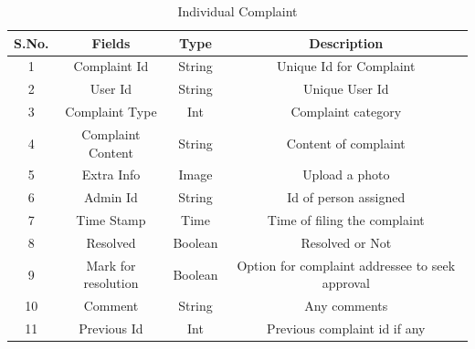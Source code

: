 \documentclass{article}
\begin{document}
\begin{table}[H]
\centering
\caption{Individual Complaint}
\label{my-label}
\begin{tabular}{|c|c|c|c|}
\hline
\textbf{S.No.} & \textbf{Fields}     & \textbf{Type} & \textbf{Description}                            \\ \hline
1              & Complaint Id        & String        & Unique Id for Complaint                         \\ \hline
2              & User Id             & String        & Unique User Id                                  \\ \hline
3              & Complaint Type      & Int           & Complaint category                              \\ \hline
4              & Complaint Content   & String        & Content of complaint                            \\ \hline
5              & Extra Info          & Image         & Upload a photo                                  \\ \hline
6              & Admin Id            & String        & Id of person assigned                           \\ \hline
7              & Time Stamp          & Time          & Time of filing the complaint                    \\ \hline
8              & Resolved            & Boolean       & Resolved or Not                                 \\ \hline
9              & Mark for resolution & Boolean       & Option for complaint addressee to seek approval \\ \hline
10             & Comment             & String        & Any comments                                    \\ \hline
11             & Previous Id         & Int           & Previous complaint id if any                    \\ \hline
\end{tabular}
\end{table}
\end{document}
